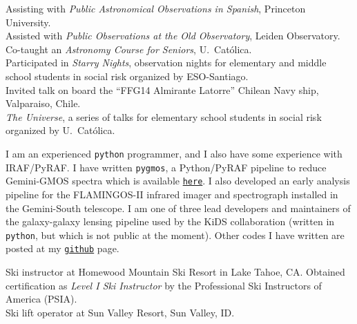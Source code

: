 \documentclass[11pt]{article}
\begin{document}

\noindent
{} Assisting with \emph{Public Astronomical Observations in Spanish}, Princeton University.\\
 Assisted with \emph{Public Observations at the Old Observatory}, Leiden Observatory.\\
 Co-taught an \emph{Astronomy Course for Seniors}, U.\ Cat\'olica.\\
 Participated in \emph{Starry Nights}, observation nights for elementary and middle school students in social risk organized by ESO-Santiago.\\
 Invited talk on board the ``FFG14 Almirante Latorre'' Chilean Navy ship, Valparaiso, Chile.\\
 \emph{The Universe}, a series of talks for elementary school students in social risk organized by U.\ Cat\'olica.\\



I am an experienced \texttt{python} programmer, and I also have some experience with IRAF/PyRAF. I have written {\tt pygmos}, a Python/PyRAF pipeline to reduce Gemini-GMOS spectra which is available \href{https://github.com/cristobal-sifon/pygmos/}{\texttt{here}}. I also developed an early analysis pipeline for the FLAMINGOS-II infrared imager and spectrograph installed in the Gemini-South telescope. I am one of three lead developers and maintainers of the galaxy-galaxy lensing pipeline used by the KiDS collaboration (written in \texttt{python}, but which is not public at the moment). Other codes I have written are posted at my \href{https://github.com/cristobal-sifon}{\texttt{github}} page.\\



\noindent
{} Ski instructor at Homewood Mountain Ski Resort in Lake Tahoe, CA. Obtained certification as \emph{Level I Ski Instructor} by the Professional Ski Instructors of America (PSIA).\\
 Ski lift operator at Sun Valley Resort, Sun Valley, ID.\\

\hline
\vspace{0.5cm}

\pagebreak
\end{document}
